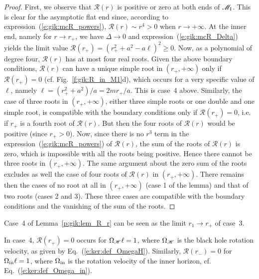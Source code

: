 \begin{proof}
First, we observe that $\mathcal{R}(r)$ is positive or zero at both
ends of $\mathscr{M}_{\rm I}$. This is clear
for the asymptotic flat end since, according to expression~(\ref{e:gik:mcR_powers}),
$\mathcal{R}(r) \sim r^4 > 0$ when $r\to +\infty$. At the inner end,
namely for $r \to r_+$,
we have $\Delta \to 0$ and expression~(\ref{e:gik:mcR_Delta}) yields the limit value
$\mathcal{R}(r_+) = (r_+^2 + a^2 - a \ell)^2 \geq 0$.
Now, as a polynomial of degree four, $\mathcal{R}(r)$ has at most four real roots.
Given the above boundary conditions, $\mathcal{R}(r)$ can have
a unique simple root in $(r_+,+\infty)$ only if $\mathcal{R}(r_+) = 0$ (cf. Fig.~\ref{f:gik:R_in_M1}d),
which occurs for a very specific value of $\ell$, namely $\ell = (r_+^2 + a^2)/a = 2 m r_+/a$.
This is case~4 above.
Similarly, the case of three roots in $(r_+,+\infty)$, either three simple roots or one double and one simple root,
is compatible with the boundary conditions only if $\mathcal{R}(r_+) = 0$, i.e.
if $r_+$ is a fourth root of $\mathcal{R}(r)$.
But then the four roots of $\mathcal{R}(r)$ would be positive (since $r_+ > 0$).
Now, since there is no $r^3$ term in the expression~(\ref{e:gik:mcR_powers}) of $\mathcal{R}(r)$,
the sum of the roots of $\mathcal{R}(r)$ is zero, which is impossible with all
the roots being positive. Hence there cannot be three roots in $(r_+,+\infty)$.
The same argument about the zero sum of the roots excludes as well the case
of four roots of $\mathcal{R}(r)$ in $(r_+,+\infty)$.
There remains then the cases of no root at all in  $(r_+,+\infty)$ (case 1 of the lemma) and that of two
roots (cases 2 and 3). These three cases are compatible
with the boundary conditions and the vanishing of the sum of the roots.
\end{proof}

\begin{remark}
Case~4 of Lemma~\ref{p:gik:lem_R_r} can be seen as the limit $r_1\to r_+$ of case~3.
\end{remark}

\begin{remark}
In case~4, $\mathcal{R}(r_+) = 0$ occurs for $\Omega_{\mathscr{H}} \ell = 1$, where $\Omega_{\mathscr{H}}$ is the black hole
rotation velocity,
as given by Eq.~(\ref{e:ker:def_OmegaH}). Similarly, $\mathcal{R}(r_-) = 0$ for $\Omega_{\rm in} \ell = 1$,
where $\Omega_{\rm in}$ is the rotation velocity of the inner horizon, cf. Eq.~(\ref {e:ker:def_Omega_in}).
\end{remark}

